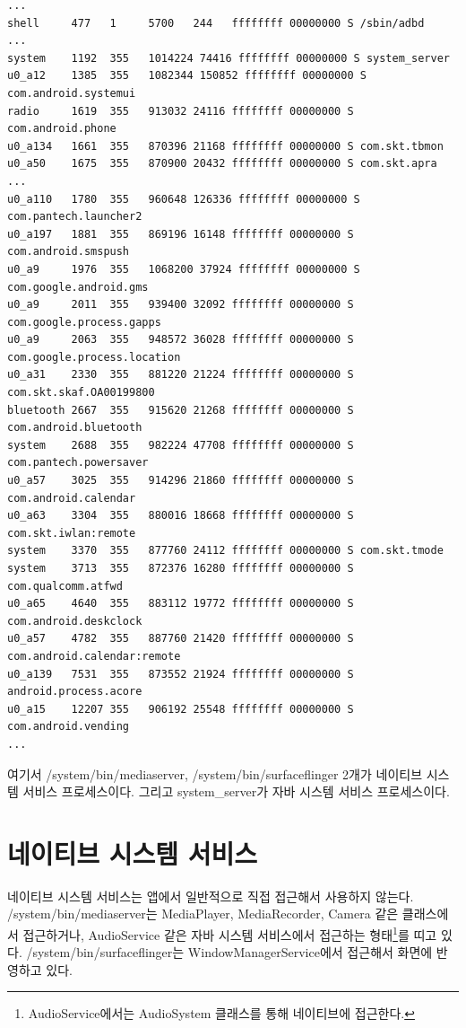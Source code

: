 \begin{lstlisting}[frame=single]
...
shell     477   1     5700   244   ffffffff 00000000 S /sbin/adbd
...
system    1192  355   1014224 74416 ffffffff 00000000 S system_server
u0_a12    1385  355   1082344 150852 ffffffff 00000000 S com.android.systemui
radio     1619  355   913032 24116 ffffffff 00000000 S com.android.phone
u0_a134   1661  355   870396 21168 ffffffff 00000000 S com.skt.tbmon
u0_a50    1675  355   870900 20432 ffffffff 00000000 S com.skt.apra
...
u0_a110   1780  355   960648 126336 ffffffff 00000000 S com.pantech.launcher2
u0_a197   1881  355   869196 16148 ffffffff 00000000 S com.android.smspush
u0_a9     1976  355   1068200 37924 ffffffff 00000000 S com.google.android.gms
u0_a9     2011  355   939400 32092 ffffffff 00000000 S com.google.process.gapps
u0_a9     2063  355   948572 36028 ffffffff 00000000 S com.google.process.location
u0_a31    2330  355   881220 21224 ffffffff 00000000 S com.skt.skaf.OA00199800
bluetooth 2667  355   915620 21268 ffffffff 00000000 S com.android.bluetooth
system    2688  355   982224 47708 ffffffff 00000000 S com.pantech.powersaver
u0_a57    3025  355   914296 21860 ffffffff 00000000 S com.android.calendar
u0_a63    3304  355   880016 18668 ffffffff 00000000 S com.skt.iwlan:remote
system    3370  355   877760 24112 ffffffff 00000000 S com.skt.tmode
system    3713  355   872376 16280 ffffffff 00000000 S com.qualcomm.atfwd
u0_a65    4640  355   883112 19772 ffffffff 00000000 S com.android.deskclock
u0_a57    4782  355   887760 21420 ffffffff 00000000 S com.android.calendar:remote
u0_a139   7531  355   873552 21924 ffffffff 00000000 S android.process.acore
u0_a15    12207 355   906192 25548 ffffffff 00000000 S com.android.vending
...
\end{lstlisting}

여기서 /system/bin/mediaserver, /system/bin/surfaceflinger 2개가 네이티브 시스템 서비스 프로세스이다. 그리고 system\_server가 자바 시스템 서비스 프로세스이다.

\section{네이티브 시스템 서비스}
네이티브 시스템 서비스는 앱에서 일반적으로 직접 접근해서 사용하지 않는다.
/system/bin/mediaserver는 MediaPlayer, MediaRecorder, Camera 같은 클래스에서 접근하거나, AudioService 같은 자바 시스템 서비스에서 접근하는 형태\footnote{AudioService에서는 AudioSystem 클래스를 통해 네이티브에 접근한다.}를 띠고 있다.
/system/bin/surfaceflinger는 WindowManagerService에서 접근해서 화면에 반영하고 있다.

